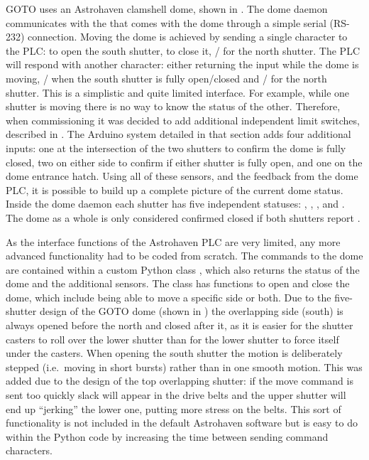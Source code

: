 \begin{colsection}
GOTO uses an Astrohaven clamshell dome, shown in . The dome daemon communicates with the  that comes with the dome through a simple serial (RS-232) connection. Moving the dome is achieved by sending a single character to the PLC:\@ {} to open the south shutter,  to close it, / for the north shutter. The PLC will respond with another character: either returning the input while the dome is moving, / when the south shutter is fully open/closed and / for the north shutter. This is a simplistic and quite limited interface. For example, while one shutter is moving there is no way to know the status of the other. Therefore, when commissioning it was decided to add additional independent limit switches, described in . The Arduino system detailed in that section adds four additional inputs: one at the intersection of the two shutters to confirm the dome is fully closed, two on either side to confirm if either shutter is fully open, and one on the dome entrance hatch. Using all of these sensors, and the feedback from the dome PLC, it is possible to build up a complete picture of the current dome status. Inside the dome daemon each shutter has five independent statuses: , , ,  and . The dome as a whole is only considered confirmed closed if both shutters report .

As the interface functions of the Astrohaven PLC are very limited, any more advanced functionality had to be coded from scratch. The commands to the dome are contained within a custom Python class , which also returns the status of the dome and the additional sensors. The class has functions to open and close the dome, which include being able to move a specific side or both. Due to the five-shutter design of the GOTO dome (shown in ) the overlapping side (south) is always opened before the north and closed after it, as it is easier for the shutter casters to roll over the lower shutter than for the lower shutter to force itself under the casters. When opening the south shutter the motion is deliberately stepped (i.e.\ moving in short bursts) rather than in one smooth motion. This was added due to the design of the top overlapping shutter: if the move command is sent too quickly slack will appear in the drive belts and the upper shutter will end up ``jerking'' the lower one, putting more stress on the belts. This sort of functionality is not included in the default Astrohaven software but is easy to do within the Python code by increasing the time between sending command characters.


\end{colsection}
